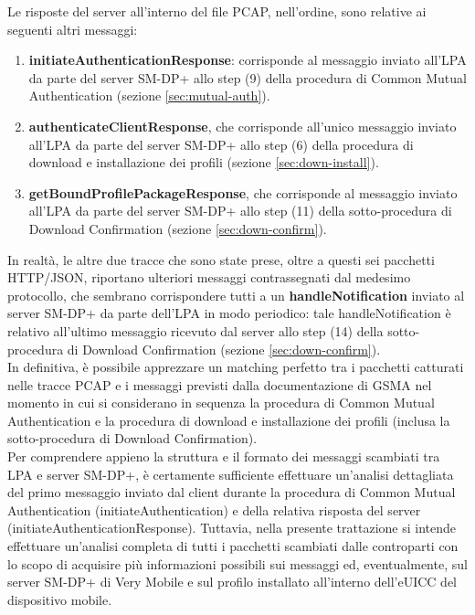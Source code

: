 \documentclass[10pt, oneside]{book}
\begin{document}
Le risposte del server all'interno del file PCAP, nell'ordine, sono relative ai seguenti altri messaggi:
\begin{enumerate}
\item \textbf{initiateAuthenticationResponse}: corrisponde al messaggio inviato all'LPA da parte del server SM-DP+ allo step (9) della procedura di Common Mutual Authentication (sezione \ref{sec:mutual-auth}).
\item \textbf{authenticateClientResponse}, che corrisponde all'unico messaggio inviato all'LPA da parte del server SM-DP+ allo step (6) della procedura di download e installazione dei profili (sezione \ref{sec:down-install}).
\item \textbf{getBoundProfilePackageResponse}, che corrisponde al messaggio inviato all'LPA da parte del server SM-DP+ allo step (11) della sotto-procedura di Download Confirmation (sezione \ref{sec:down-confirm}).
\end{enumerate}
In realtà, le altre due tracce che sono state prese, oltre a questi sei pacchetti HTTP/JSON, riportano ulteriori messaggi contrassegnati dal medesimo protocollo, che sembrano corrispondere tutti a un \textbf{handleNotification} inviato al server SM-DP+ da parte dell'LPA in modo periodico: tale handleNotification è relativo all'ultimo messaggio ricevuto dal server allo step (14) della sotto-procedura di Download Confirmation (sezione \ref{sec:down-confirm}).\\
In definitiva, è possibile apprezzare un matching perfetto tra i pacchetti catturati nelle tracce PCAP e i messaggi previsti dalla documentazione di GSMA \cite{GSMA-docs-new} nel momento in cui si considerano in sequenza la procedura di Common Mutual Authentication e la procedura di download e installazione dei profili (inclusa la sotto-procedura di Download Confirmation).\\
Per comprendere appieno la struttura e il formato dei messaggi scambiati tra LPA e server SM-DP+, è certamente sufficiente effettuare un'analisi dettagliata del primo messaggio inviato dal client durante la procedura di Common Mutual Authentication (initiateAuthentication) e della relativa risposta del server (initiateAuthenticationResponse). Tuttavia, nella presente trattazione si intende effettuare un'analisi completa di tutti i pacchetti scambiati dalle controparti con lo scopo di acquisire più informazioni possibili sui messaggi ed, eventualmente, sul server SM-DP+ di Very Mobile e sul profilo installato all'interno dell'eUICC del dispositivo mobile.
\end{document}
